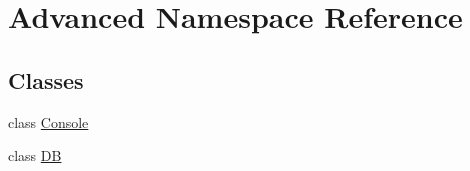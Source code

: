 \hypertarget{namespace_advanced}{}\section{Advanced Namespace Reference}
\label{namespace_advanced}
\subsection*{Classes}
\begin{DoxyCompactItemize}
\item 
class \mbox{\hyperlink{class_advanced_1_1_console}{Console}}
\item 
class \mbox{\hyperlink{class_advanced_1_1_d_b}{DB}}
\end{DoxyCompactItemize}
